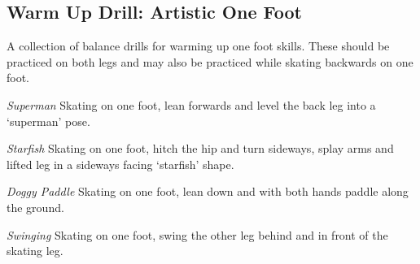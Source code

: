 \subsection*{Warm Up Drill: Artistic One Foot} 
\label{drill:one_foot/warm_up/artistic}

A collection of balance drills for warming up one foot skills.
These should be practiced on both legs and may also be practiced while skating backwards on one foot. 

{\it Superman}
Skating on one foot, lean forwards and level the back leg into a `superman' pose.


{\it Starfish}
Skating on one foot, hitch the hip and turn sideways, splay arms and lifted leg in a sideways facing `starfish' shape. 


{\it Doggy Paddle}
Skating on one foot, lean down and with both hands paddle along the ground.


{\it Swinging}
Skating on one foot, swing the other leg behind and in front of the skating leg. 
